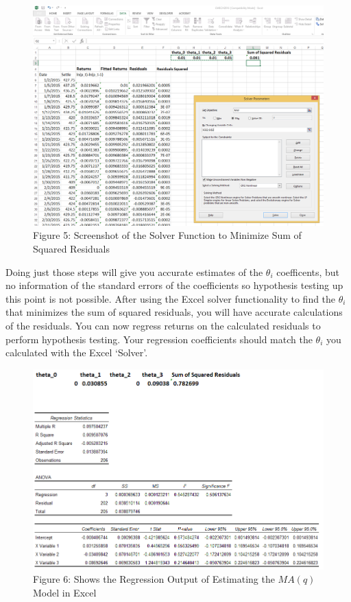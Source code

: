 \documentclass[]{book}
\theoremstyle{definition}
\theoremstyle{definition}
\theoremstyle{remark}
\begin{document}
\begin{figure}[htbp]
\centering
\includegraphics{images/12_solvermaq.png}
\caption{Figure 5: Screenshot of the Solver Function to Minimize Sum of
Squared Residuals}
\end{figure}

Doing just those steps will give you accurate estimates of the
\(\theta_i\) coefficents, but no information of the standard errors of
the coefficients so hypothesis testing up this point is not possible.
After using the Excel solver functionality to find the \(\theta_i\) that
minimizes the sum of squared residuals, you will have accurate
calculations of the residuals. You can now regress returns on the
calculated residuals to perform hypothesis testing. Your regression
coefficients should match the \(\theta_i\) you calculated with the Excel
`Solver'.

\begin{figure}[htbp]
\centering
\includegraphics{images/12_ma2.png}
\caption{Figure 6: Shows the Regression Output of Estimating the
\(MA(q)\) Model in Excel}
\end{figure}
\end{document}
